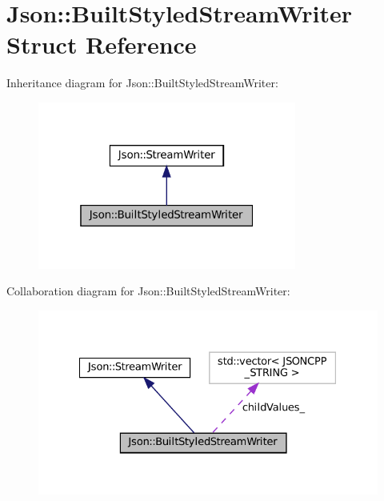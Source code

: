 \hypertarget{structJson_1_1BuiltStyledStreamWriter}{}\section{Json\+:\+:Built\+Styled\+Stream\+Writer Struct Reference}
\label{structJson_1_1BuiltStyledStreamWriter}


Inheritance diagram for Json\+:\+:Built\+Styled\+Stream\+Writer\+:
\nopagebreak
\begin{figure}[H]
\begin{center}
\leavevmode
\includegraphics[width=241pt]{structJson_1_1BuiltStyledStreamWriter__inherit__graph}
\end{center}
\end{figure}


Collaboration diagram for Json\+:\+:Built\+Styled\+Stream\+Writer\+:
\nopagebreak
\begin{figure}[H]
\begin{center}
\leavevmode
\includegraphics[width=328pt]{structJson_1_1BuiltStyledStreamWriter__coll__graph}
\end{center}
\end{figure}

